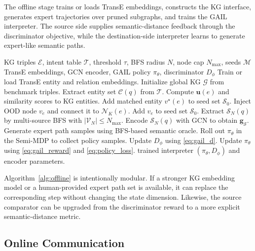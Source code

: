 \documentclass[journal]{IEEEtran}
\newcommand{\KG}{\mathcal{G}}
\newcommand{\SG}{\mathcal{S}}
\newcommand{\calC}{\mathcal{C}}
\newcommand{\calE}{\mathcal{E}}
\newcommand{\calN}{\mathcal{N}}
\newcommand{\calS}{\mathcal{S}}
\newcommand{\calV}{\mathcal{V}}
\begin{document}
The offline stage trains or loads TransE embeddings, constructs the KG interface, generates expert trajectories over pruned subgraphs, and trains the GAIL interpreter. The source side supplies semantic-distance feedback through the discriminator objective, while the destination-side interpreter learns to generate expert-like semantic paths.

\begin{algorithm}[!t]
\caption{Offline Training of the LLM-Free Semantic Interpreter}
\label{alg:offline}
\begin{algorithmic}[1]
\REQUIRE KG triples $\calE$, intent table $\mathcal{T}$, threshold $\tau$, BFS radius $N$, node cap $N_{\max}$, seeds $\mathcal{M}$
\ENSURE TransE embeddings, GCN encoder, GAIL policy $\pi_\theta$, discriminator $D_\phi$
\STATE Train or load TransE entity and relation embeddings.
\STATE Initialize global KG $\KG$ from benchmark triples.
    \STATE Extract entity set $\calC(q)$ from $\mathcal{T}$.
    \FOR{each entity keyword $e\in\calC(q)$}
        \STATE Compute $\mathbf{u}(e)$ and similarity scores to KG entities.
            \STATE Add matched entity $v^\star(e)$ to seed set $\calS_0$.
        \ELSE
            \STATE Inject OOD node $v_e$ and connect it to $\calN_K(e)$.
            \STATE Add $v_e$ to seed set $\calS_0$.
        \ENDIF
    \ENDFOR
    \STATE Extract $\SG_N(q)$ by multi-source BFS with $|\calV_N|\leq N_{\max}$.
    \STATE Encode $\SG_N(q)$ with GCN to obtain $\mathbf{g}_{\SG}$.
    \STATE Generate expert path samples using BFS-based semantic oracle.
    \STATE Roll out $\pi_\theta$ in the Semi-MDP to collect policy samples.
    \STATE Update $D_\phi$ using \eqref{eq:gail_d}.
    \STATE Update $\pi_\theta$ using \eqref{eq:gail_reward} and \eqref{eq:policy_loss}.
\ENDFOR
\RETURN trained interpreter $(\pi_\theta,D_\phi)$ and encoder parameters.
\end{algorithmic}
\end{algorithm}

Algorithm~\ref{alg:offline} is intentionally modular. If a stronger KG embedding model or a human-provided expert path set is available, it can replace the corresponding step without changing the state dimension. Likewise, the source comparator can be upgraded from the discriminator reward to a more explicit semantic-distance metric.

\subsection{Online Communication}
\end{document}
